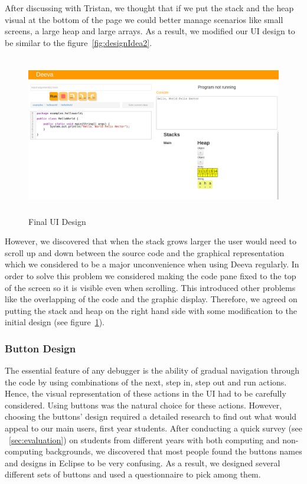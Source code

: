 \documentclass[11pt, a4paper]{article}
\begin{document}
After discussing with Tristan, we thought that if we put the stack and the heap visual at the bottom of the page we could better manage scenarios like small screens, a large heap and large arrays.
As a result, we modified our UI design to be similar to the figure~\ref{fig:designIdea2}.\\
\begin{figure}[h!]
\centering
\includegraphics[height=70mm,width=130mm]{finalDesign.png}
\caption{Final UI Design}
\label{fig:finalDesign}
\end{figure}

However, we discovered that when the stack grows larger the user would need to scroll up and down between the source code and the graphical representation which we considered to be a major unconvenience when using Deeva regularly.
In order to solve this problem we considered making the code pane fixed to the top of the screen so it is visible even when scrolling. 
This introduced other problems like the overlapping of the code and the graphic display. 
Therefore, we agreed on putting the stack and heap on the right hand side with some modification to the initial design (see figure~\ref{fig:finalDesign}).

\subsubsection{Button Design}
The essential feature of any debugger is the ability of gradual navigation through the code by using combinations of the next, step in, step out and run actions. 
Hence, the visual representation of these actions in the UI had to be carefully considered. 
Using buttons was the natural choice for these actions. However, choosing the buttons' design required a detailed research to find out what would appeal to our main users, first year students.
After conducting a quick survey (see ~\cref{sec:evaluation}) on students from different years with both computing and non-computing backgrounds, we discovered that most people found the buttons names and designs in Eclipse to be very confusing.
As a result, we designed several different sets of buttons and used a questionnaire to pick among them.
\end{document}
